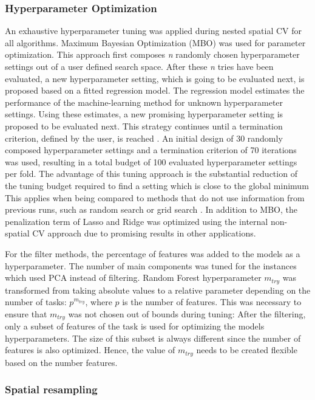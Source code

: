 \documentclass[letterpaper, journal]{IEEEtran}
\begin{document}
\subsubsection{Hyperparameter Optimization}

\noindent An exhaustive hyperparameter tuning was applied during nested spatial \ac{CV} for all algorithms.
Maximum Bayesian Optimization \cite{mlrmbo} (MBO) was used for parameter optimization.
This approach first composes \textit{n} randomly chosen hyperparameter settings out of a user defined search space.
After these \textit{n} tries have been evaluated, a new hyperparameter setting, which is going to be evaluated next, is proposed based on a fitted regression model.
The regression model estimates the performance of the machine-learning method for unknown hyperparameter settings.
Using these estimates, a new promising hyperparameter setting is proposed to be evaluated next.
This strategy continues until a termination criterion, defined by the user, is reached \cite{hutter2011, jones1998}.
An initial design of 30 randomly composed hyperparameter settings and a termination criterion of 70 iterations was used, resulting in a total budget of 100 evaluated hyperparameter settings per fold.
The advantage of this tuning approach is the substantial reduction of the tuning budget required to find a setting which is close to the global minimum
This applies when being compared to methods that do not use information from previous runs, such as random search or grid search \cite{bergstra2012}.
In addition to MBO, the penalization term of Lasso and Ridge was optimized using the internal non-spatial CV approach due to promising results in other applications.

For the filter methods, the percentage of features was added to the models as a hyperparameter.
The number of main components was tuned for the instances which used \ac{PCA} instead of filtering.
Random Forest hyperparameter \texttt{$m_{try}$} was transformed from taking absolute values to a relative parameter depending on the number of tasks: $p^{m_{try}}$, where $p$ is the number of features.
This was necessary to ensure that \texttt{$m_{try}$} was not chosen out of bounds during tuning:
After the filtering, only a subset of features of the task is used for optimizing the models hyperparameters.
The size of this subset is always different since the number of features is also optimized.
Hence, the value of  \texttt{$m_{try}$} needs to be created flexible based on the number features.

\subsubsection{Spatial resampling}
\end{document}
